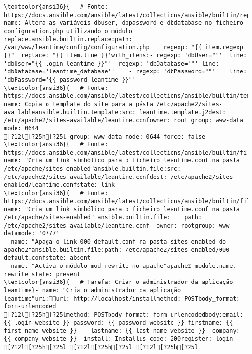 \documentclass{scrartcl}
\begin{document}
\begin{Verbatim}
\textcolor{ansi36}{   # Fonte: https://docs.ansible.com/ansible/latest/collections/ansible/builtin/replace_module.html}- name: Altera as variáveis dbuser, dbpassword e dbdatabase no ficheiro configuration.php utilizando o módulo replace.ansible.builtin.replace:path: /var/www/leantime/config/configuration.php    regexp: "{{ item.regexp  }}"  replace: "{{ item.line }}"with_items:- regexp: 'dbUser=""'  line: 'dbUser="{{ login_leantime }}"'- regexp: 'dbDatabase=""' line: 'dbDatabase="leantime_database"'    - regexp: 'dbPassword=""'    line: 'dbPassword="{{ password_leantime }}"'
\textcolor{ansi36}{   # Fonte: https://docs.ansible.com/ansible/latest/collections/ansible/builtin/template_module.html}- name: Copia o template do site para a pásta /etc/apache2/sites-availableansible.builtin.template:src: leantime.template.j2dest: /etc/apache2/sites-available/leantime.confowner: root group: www-data mode: 0644
[?12l[?25h[?25l group: www-data mode: 0644 force: false
\textcolor{ansi36}{   # Fonte: https://docs.ansible.com/ansible/latest/collections/ansible/builtin/file_module.html}- name: "Cria um link simbólico para o ficheiro leantime.conf na pasta /etc/apache/sites-enabled"ansible.builtin.file:src: /etc/apache2/sites-available/leantime.confdest: /etc/apache2/sites-enabled/leantime.confstate: link
\textcolor{ansi36}{   # Fonte: https://docs.ansible.com/ansible/latest/collections/ansible/builtin/file_module.html}- name: "Cria um link simbólico para o ficheiro leantime.conf na pasta /etc/apache/sites-enabled" ansible.builtin.file:    path: /etc/apache2/sites-available/leantime.conf  owner: rootgroup: www-datamode: '0777'
- name: "Apaga o link 000-default.conf na pasta sites-enabled do apache2"ansible.builtin.file:path: /etc/apache2/sites-enabled/000-default.confstate: absent
- name: "Activa o módulo mod_rewrite no apache"apache2_module:name: rewrite state: present
\textcolor{ansi36}{   # Tarefa: Criar o administrador da aplicação leantime}- name: "Cria o administrador da aplicação leantime"uri:url: http://localhost/installmethod: POSTbody_format: form-urlencoded
[?12l[?25h[?25lmethod: POSTbody_format: form-urlencodedbody:email: {{ login_website }} password: {{ password_website }} firstname: {{ first_name_website }}    lastname: {{ last_name_website }}  company: {{ company_website }}  install: Installus_code: 200register: login
[?12l[?25h[?25l [?12l[?25h[?25l [?12l[?25h[?25l

\end{Verbatim}
\end{document}
